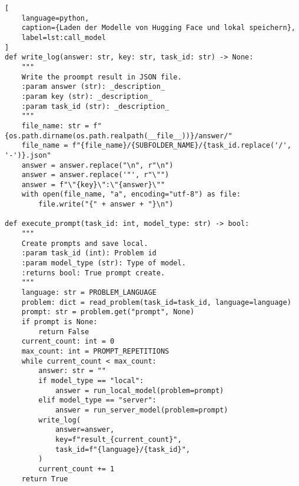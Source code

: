 \begin{lstlisting}[
	language=python,
	caption={Laden der Modelle von Hugging Face und lokal speichern},
	label=lst:call_model
]
def write_log(answer: str, key: str, task_id: str) -> None:
    """
    Write the proompt result in JSON file.
    :param answer (str): _description_
    :param key (str): _description_
    :param task_id (str): _description_
    """
    file_name: str = f"{os.path.dirname(os.path.realpath(__file__))}/answer/"
    file_name = f"{file_name}/{SUBFOLDER_NAME}/{task_id.replace('/', '-')}.json"
    answer = answer.replace("\n", r"\n")
    answer = answer.replace('"', r"\"")
    answer = f"\"{key}\":\"{answer}\""
    with open(file_name, "a", encoding="utf-8") as file:
        file.write("{" + answer + "}\n")

def execute_prompt(task_id: int, model_type: str) -> bool:
    """
    Create prompts and save local.
    :param task_id (int): Problem id
    :param model_type (str): Type of model.
    :returns bool: True prompt create.
    """
    language: str = PROBLEM_LANGUAGE
    problem: dict = read_problem(task_id=task_id, language=language)
    prompt: str = problem.get("prompt", None)
    if prompt is None:
        return False
    current_count: int = 0
    max_count: int = PROMPT_REPETITIONS
    while current_count < max_count:
        answer: str = ""
        if model_type == "local":
            answer = run_local_model(problem=prompt)
        elif model_type == "server":
            answer = run_server_model(problem=prompt)
        write_log(
            answer=answer,
            key=f"result_{current_count}",
            task_id=f"{language}/{task_id}",
        )
        current_count += 1
    return True
\end{lstlisting}